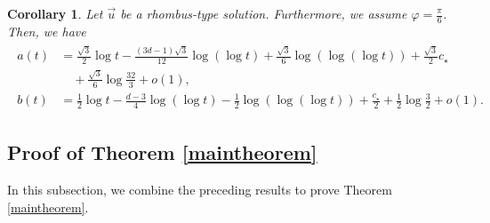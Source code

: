 \documentclass[10pt,a4paper]{amsart}
\newtheorem{corollary}[theorem]{Corollary}
\numberwithin{equation}{section}
\begin{document}
\begin{corollary}\label{abescoro}
Let $\vec{u}$ be a rhombus-type solution. Furthermore, we assume $\varphi=\frac{\pi}{6}$. Then, we have
\begin{align}\label{abessharpgyaku}
\begin{aligned}
a(t)&=\frac{\sqrt{3}}{2}\log{t}-\frac{(3d-1)\sqrt{3}}{12}\log{(\log{t})}+\frac{\sqrt{3}}{6}\log{(\log{(\log{t})})}+\frac{\sqrt{3}}{2}c_{\star}
\\
&\quad+\frac{\sqrt{3}}{6}\log{\frac{32}{3}}+o(1),
\\
b(t)&=\frac{1}{2}\log{t}-\frac{d-3}{4}\log{(\log{t})}-\frac{1}{2}\log{(\log{(\log{t})})}+\frac{c_{\star}}{2}+\frac{1}{2}\log{\frac{3}{2}}+o(1).
\end{aligned}
\end{align}

\end{corollary}




\subsection{Proof of Theorem \ref{maintheorem}}


In this subsection, we combine the preceding results to prove Theorem \ref{maintheorem}.
\end{document}
